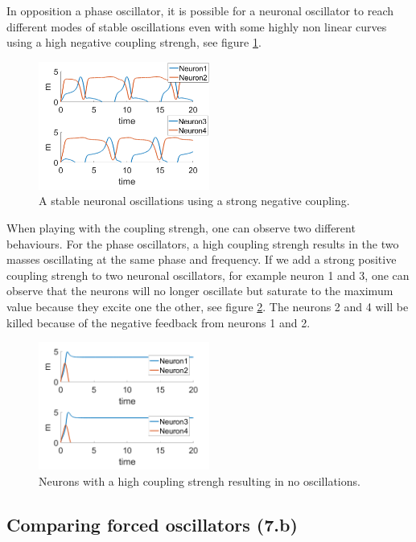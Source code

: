 \documentclass[a4paper]{scrartcl}
\begin{document}
In opposition a phase oscillator, it is possible for a neuronal oscillator to reach different modes of stable oscillations even with some highly non linear curves using a high negative coupling strengh, see figure \ref{crazy}.

\begin{figure}[!h]
	\centering
	\includegraphics[width=0.5\textwidth]{fig/crazy.png}
	\caption{A stable neuronal oscillations using a strong negative coupling.}\label{crazy}
\end{figure}

When playing with the coupling strengh, one can observe two different behaviours. For the phase oscillators, a high coupling strengh results in the two masses oscillating at the same phase and frequency. If we add a strong positive coupling strengh to two neuronal oscillators, for example neuron 1 and 3, one can observe that the neurons will no longer oscillate but saturate to the maximum value because they excite one the other, see figure \ref{kill}. The neurons 2 and 4 will be killed because of the negative feedback from neurons 1 and 2.

\begin{figure}[!h]
	\centering
	\includegraphics[width=0.5\textwidth]{fig/kill.png}
	\caption{Neurons with a high coupling strengh resulting in no oscillations.}\label{kill}
\end{figure}

\newpage

\subsection{Comparing forced oscillators (7.b)}
\end{document}
